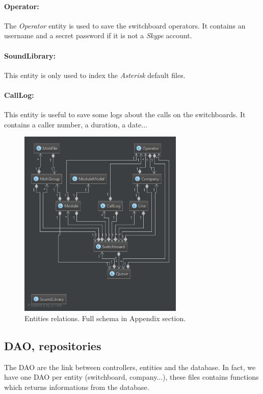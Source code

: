 \paragraph{Operator:}
The \textit{Operator} entity is used to save the switchboard operators. It contains an username and a secret password if it is not a \textit{Skype} account.

\paragraph{SoundLibrary:}
This entity is only used to index the \textit{Asterisk} default files.

\paragraph{CallLog:}
This entity is useful to save some logs about the calls on the switchboards. It contains a caller number, a duration, a date... 

\begin{figure}[H]
  \caption{Entities relations.
  Full schema in Appendix section.}
  \centering
    \includegraphics[width=0.7\textwidth]{img/modelsSimple.png}
\end{figure}




\subsection{DAO, repositories}


The DAO are the link between controllers, entities and the database. 
In fact, we have one DAO per entity (switchboard, company...), these files contains functions which returns informations from the database. 

